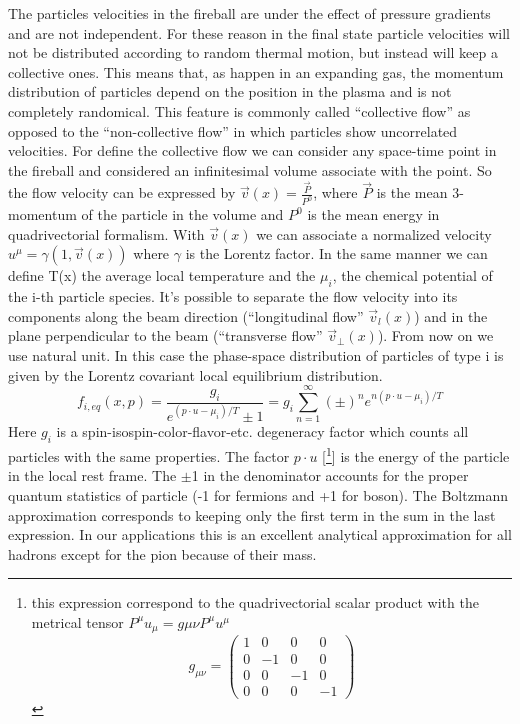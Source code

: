 \documentclass[12pt,a4paper]{book}
\begin{document}
	The particles velocities in the fireball are under the effect of pressure gradients and are not	independent. For these reason in the final state particle velocities will not be distributed according to random thermal motion, but instead will keep a collective ones. This means that, as happen in an expanding gas, the momentum distribution of particles depend on the position in the plasma and is not completely randomical. This feature is commonly called “collective flow” as opposed to the “non-collective flow” in which particles show uncorrelated velocities. For define the collective flow we can consider any space-time point in the fireball and considered an infinitesimal volume associate with the point. So the flow velocity can be expressed by $\vec{v}(x) =\frac{\vec{P}}{P^0}$, where $\vec{P}$ is the mean 3-momentum of the particle in the volume and $P^0$ is the mean energy in quadrivectorial formalism. With $\vec{v}(x)$ we can associate a normalized velocity $u^\mu=\gamma(1,\vec{v}(x))$ where $\gamma$ is the Lorentz factor. In the same manner we can define T(x) the average local temperature and the $\mu_i$, the chemical potential of the i-th particle species.  It's possible to separate the flow velocity into its components along the beam direction (“longitudinal flow” $\vec{v}_l(x)$) and in the plane perpendicular to the beam (“transverse flow” $\vec{v}_\perp(x)$). From now on we use natural unit. In this case the phase-space distribution of particles of type i is given by the Lorentz covariant local equilibrium distribution.
	\begin{equation}
		f_{i,eq}(x,p)=\frac{g_i}{e^{(p \cdot u - \mu_i)/T} \pm 1} = g_i \sum_{n=1}^{\infty} (\pm)^{n} e^{n(p \cdot u - \mu_i)/T}
		\label{eq:boltzmann}
	\end{equation}
	Here $g_i$ is a spin-isospin-color-flavor-etc. degeneracy factor which counts all particles with the same properties. The factor $p \cdot u$ [\footnote{this expression correspond to the quadrivectorial scalar product with the metrical tensor $P^\mu u_\mu = g{\mu \nu} P^\mu u^\mu$ \[
		g_{\mu\nu} =
		\begin{pmatrix}
			1 & 0 & 0 & 0 \\
			0 & -1 & 0 & 0 \\
			0 & 0 & -1 & 0 \\
			0 & 0 & 0 & -1
		\end{pmatrix}
		\]}] is the energy of the particle in the local rest frame. The $\pm$1 in the denominator accounts for the proper quantum statistics of particle (-1 for fermions and +1 for boson). The Boltzmann approximation corresponds to keeping only the first term in the sum in the last expression. In our applications this is an excellent analytical approximation for all hadrons except for the pion because of their mass.
	
\end{document}
